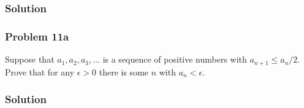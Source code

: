 \subsubsection*{Solution}

\subsubsection*{Problem 11a}
Suppose that $a_{1}, a_{2}, a_{3}, \ldots$ is a sequence of positive
numbers with $a_{n+1}\leq a_{n}/2$. Prove that for any $\epsilon>0$ there is
some $n$ with $a_{n}<\epsilon$.

\subsubsection*{Solution}


